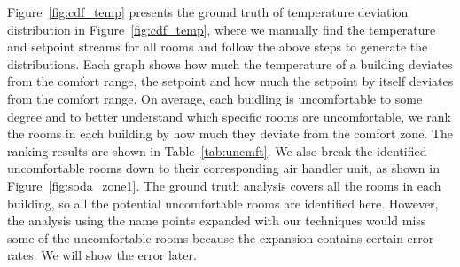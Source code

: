 Figure~\ref{fig:cdf_temp} presents the ground truth of temperature deviation distribution in Figure~\ref{fig:cdf_temp}, where we manually find the temperature and setpoint streams for all rooms and follow the above steps to generate the distributions. Each graph shows how much the temperature of a building deviates from the comfort range, the setpoint and how much the setpoint by itself deviates from the comfort range. On average, each buidling is uncomfortable to some degree and to better understand which specific rooms are uncomfortable, we rank the rooms in each building by how much they deviate from the comfort zone. The ranking results are shown in Table~\ref{tab:uncmft}. We also break the identified uncomfortable rooms down to their corresponding air handler unit, as shown in Figure~\ref{fig:soda_zone1}. The ground truth analysis covers all the rooms in each building, so all the potential uncomfortable rooms are identified here. However, the analysis using the name points expanded with our techniques would miss some of the uncomfortable rooms because the expansion contains certain error rates. We will show the error later.


